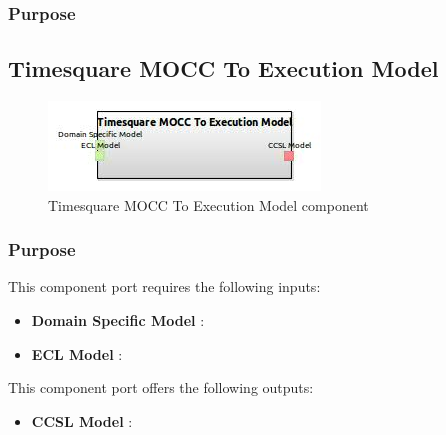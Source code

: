\documentclass{gemoc} %
\begin{document}
\subsubsection{Purpose}



\subsection{Timesquare MOCC To Execution Model}

\begin{figure}[htp]
	\begin{center}
	\includegraphics*[trim=0.0cm 0.0cm 0cm 0.0cm, clip=true, scale=1.0]{../images/generated/Generated_Timesquare MOCC To Execution Model.jpg}
	\caption{Timesquare MOCC To Execution Model component}
	\end{center}
\end{figure}

\subsubsection{Purpose}

This component port requires the following inputs:
\begin{itemize}
  \item \textbf{Domain Specific Model} :
  \item \textbf{ECL Model} :
\end{itemize}

This component port offers the following outputs:
\begin{itemize}
  \item \textbf{CCSL Model} :
\end{itemize}
\end{document}
